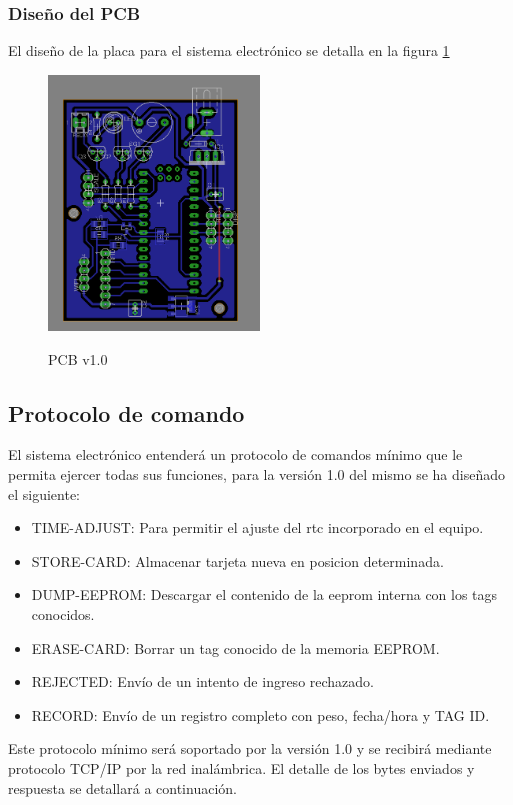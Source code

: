 \subsubsection{Dise\~no del PCB}
El dise\~no de la placa para el sistema electr\'onico se detalla en la figura \ref{fig:pcb}
\begin{figure}[h!]
	\caption{PCB v1.0}
	\includegraphics[width=0.5\textwidth]{images/weightlogger_pcb}
	\label{fig:pcb}
\end{figure}

\subsection{Protocolo de comando}
El sistema electrónico entenderá un protocolo de comandos mínimo que le permita ejercer todas sus funciones, para la versión 1.0 del mismo se ha diseñado el siguiente:
\begin{itemize}
	\item TIME-ADJUST: Para permitir el ajuste del rtc incorporado en el equipo.
	\item STORE-CARD: Almacenar tarjeta nueva en posicion determinada.
	\item DUMP-EEPROM: Descargar el contenido de la eeprom interna con los tags conocidos.
	\item ERASE-CARD: Borrar un tag conocido de la memoria EEPROM.
	\item REJECTED: Envío de un intento de ingreso rechazado.
	\item RECORD: Envío de un registro completo con peso, fecha/hora y TAG ID.
\end{itemize}
Este protocolo mínimo será soportado por la versión 1.0 y se recibirá mediante protocolo TCP/IP por la red inalámbrica. El detalle de los bytes enviados y respuesta se detallará a continuación.

